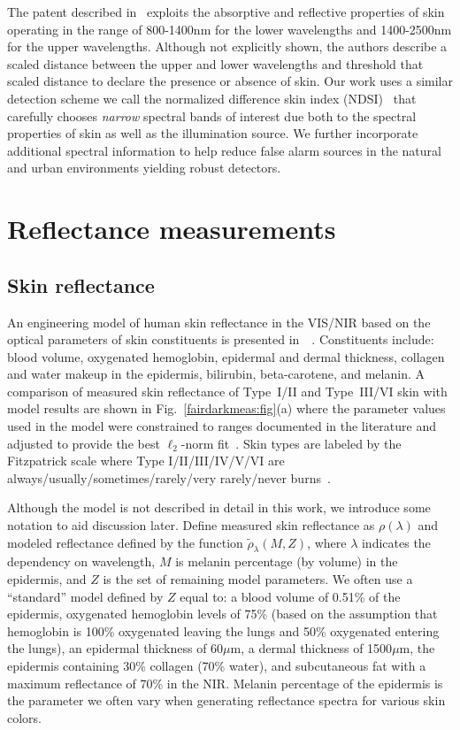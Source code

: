 \documentclass[10pt,journal,cspaper,compsoc]{IEEEtran}
\begin{document}
The patent described in~\cite{Kilgore1} exploits the absorptive and reflective properties of skin operating in the range 
of 800-1400nm for the lower wavelengths and 1400-2500nm for the upper wavelengths.  Although not explicitly shown, the authors 
describe a scaled distance between the upper and lower wavelengths and threshold that scaled distance to declare the presence 
or absence of skin. Our work uses a similar detection scheme we call the normalized difference skin index (NDSI)~\cite{Nunez7} 
that carefully chooses \emph{narrow} spectral bands of interest due both to the spectral properties of skin as well as the illumination 
source.  We further incorporate additional spectral information to help reduce false alarm sources in the natural and urban 
environments yielding robust detectors.

\section{Reflectance measurements}
\subsection{Skin reflectance}
\label{scn:skin_reflectance}
An engineering model of human skin reflectance in the VIS/NIR based on the optical parameters of skin constituents is presented in~\cite{Nunez8}~\cite{Nunez7}. 
Constituents include: blood volume, oxygenated hemoglobin, epidermal and dermal thickness, collagen and water makeup in the epidermis, 
bilirubin, beta-carotene, and melanin.  A comparison of measured skin reflectance of Type~I/II and Type~III/VI 
 skin with model 
results are shown in Fig.~\ref{fairdarkmeas:fig}(a) where the parameter values used in the model were 
constrained to ranges documented in the literature and adjusted to provide the best $\ell_2$-norm fit~\cite{Nunez8}.  Skin types are 
labeled by the Fitzpatrick scale where Type I/II/III/IV/V/VI are always/usually/sometimes/rarely/very rarely/never burns~\cite{Matts1}.

Although the model is not described in detail in this work, we introduce some notation to aid discussion later.  Define measured skin reflectance 
as $\rho(\lambda)$ and modeled reflectance defined by the function $\tilde{\rho}_{\lambda}\left(M,Z\right)$, where $\lambda$ indicates the 
dependency on wavelength, $M$ is melanin percentage (by volume) in the epidermis, and $Z$ is the set of remaining model parameters. We often 
use a ``standard'' model defined by $Z$ equal to: a blood volume of 0.51\% of the epidermis, oxygenated hemoglobin levels of 75\% (based on the assumption
that hemoglobin is 100\% oxygenated leaving the lungs and 50\% oxygenated entering the lungs), an epidermal thickness of 60$\mu$m, a dermal 
thickness of 1500$\mu$m, the epidermis containing 30\% collagen (70\% water), and subcutaneous fat with a maximum reflectance of 70\% in the NIR.  
Melanin percentage of the epidermis is the parameter we often vary when generating reflectance spectra for various skin colors.
\end{document}
